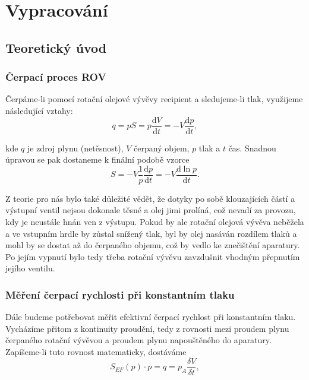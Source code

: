 \documentclass[english]{article}
\newcommand{\dd}{\mathrm{d}}
\begin{document}
\section{Vypracování}
  \subsection{Teoretický úvod}				
	\subsubsection{Čerpací proces ROV}
	
	Čerpáme-li pomocí rotační olejové vývěvy recipient a sledujeme-li
	tlak, využijeme následující vztahy:
	\begin{equation}
	q = pS = p\frac{\dd V}{\dd t} = -V\frac{\dd p}{\dd t},
	\label{cerpane_mnozstvi}
	\end{equation} 
	
	
	kde $q$ je zdroj plynu (netěsnost), $V$ čerpaný objem, $p$ tlak
	a $t$ čas. Snadnou úpravou se pak dostaneme k finální podobě vzorce
	\begin{equation}
	S=-V\frac{1}{p}\frac{\dd p}{\dd t}=-V\frac{\dd\ln p}{\dd t}.\label{eq:lnp}
	\end{equation}
	
	Z teorie pro nás bylo také důležité vědět, že dotyky po sobě klouzajících
	částí a výstupní ventil nejsou dokonale těsné a olej jimi prolíná,
	což nevadí za provozu, kdy je neustále hnán ven z výstupu. Pokud by
	ale rotační olejová vývěva neběžela a ve vstupním hrdle by zůstal
	snížený tlak, byl by olej nasáván rozdílem tlaků a mohl by se dostat
	až do čerpaného objemu, což by vedlo ke znečištění aparatury. Po jejím
	vypnutí bylo tedy třeba rotační vývěvu zavzdušnit vhodným přepnutím
	jejího ventilu.
		
	\subsubsection{Měření čerpací rychlosti při konstantním tlaku}
	
	Dále budeme potřebovat měřit efektivní čerpací rychlost při konstantním
	tlaku. Vycházíme přitom z kontinuity proudění, tedy z rovnosti mezi
	proudem plynu čerpaného rotační vývěvou a proudem plynu napouštěného
	do aparatury. Zapíšeme-li tuto rovnost matematicky, dostáváme
	\begin{equation}
	S_{EF}(p)\cdot p=q=p_{A}\frac{\delta V}{\delta t},\label{eq:Sef}
	\end{equation}
	
\end{document}
